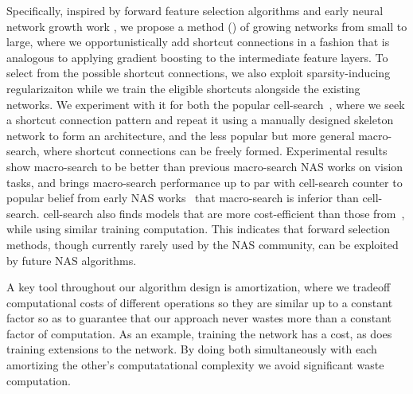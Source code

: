Specifically, inspired by forward feature selection algorithms and
early neural network growth work \citep{cascadecorr}, we propose a
method (\Petridish) of growing networks from small to large, where we
opportunistically add shortcut connections in a fashion that is
analogous to applying gradient boosting to the intermediate feature
layers. To select from the possible shortcut connections, we also
exploit sparsity-inducing regularizaiton while we train the eligible
shortcuts alongside the existing networks. We experiment with it for
both the popular cell-search~\citep{NASCell}, where we seek a shortcut
connection pattern and repeat it using a manually designed skeleton
network to form an architecture, and the less popular but more general
macro-search, where shortcut connections can be freely formed.
Experimental results show \Petridish macro-search to be better than
previous macro-search NAS works on vision tasks, and brings
macro-search performance up to par with cell-search counter
to popular belief from early NAS works~\citep{nas,Pham2018EfficientNA}
that macro-search is inferior than cell-search.  \Petridish
cell-search also finds models that are more cost-efficient than those
from~\citep{Liu2018DARTSDA}, while using similar training
computation. This indicates that forward selection methods, though
currently rarely used by the NAS community, can be exploited by future
NAS algorithms.

A key tool throughout our algorithm design is amortization, where we
tradeoff computational costs of different operations so they are
similar up to a constant factor so as to guarantee that our approach
never wastes more than a constant factor of computation.  As an
example, training the network has a cost, as does training extensions
to the network.  By doing both simultaneously with each amortizing the
other's computatational complexity we avoid significant waste
computation.

